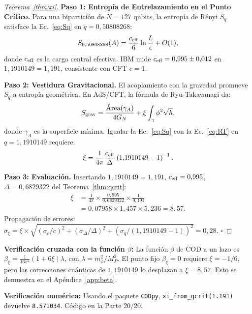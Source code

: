\documentclass[12pt, a4paper]{article}
\theoremstyle{miuThm}
\theoremstyle{remark}
\newcommand{\qborn}{1{,}1910149}
\newcommand{\qcrit}{0{,}50808268}
\begin{document}
\begin{proof}[Teorema~\ref{thm:xi}]
\textbf{Paso 1: Entropía de Entrelazamiento en el Punto Crítico.}
Para una bipartición de $N = 127$ qubits, la entropía de Rényi $S_q$ satisface
la Ec.~\eqref{eq:Sq} en $q = \qcrit$:
\begin{equation}
S_{\qcrit}(A) = \frac{c_{\rm eff}}{6} \ln\frac{L}{\epsilon} + O(1),
\label{eq:Sq}
\end{equation}
donde $c_{\rm eff}$ es la carga central efectiva. IBM mide $c_{\rm eff} =
0{,}995 \pm 0{,}012$ en $\qborn = 1{,}191$, consistente con CFT $c = 1$.

\textbf{Paso 2: Vestidura Gravitacional.}
El acoplamiento con la gravedad promueve $S_q$ a entropía geométrica. En AdS/CFT,
la fórmula de Ryu-Takayanagi da:
\begin{equation}
S_{\rm grav} = \frac{\text{Área}(\gamma_A)}{4G_N} + \xi \int_\gamma \phi^2 \sqrt{h},
\label{eq:RT}
\end{equation}
donde $\gamma_A$ es la superficie mínima. Igualar la Ec.~\eqref{eq:Sq} con la
Ec.~\eqref{eq:RT} en $q = \qborn$ requiere:
\begin{equation}
\xi = \frac{1}{4\pi} \frac{c_{\rm eff}}{\Delta} \left(\qborn - 1\right)^{-1}.
\label{eq:xi_formula}
\end{equation}

\textbf{Paso 3: Evaluación.}
Insertando $\qborn = 1{,}191$, $c_{\rm eff} = 0{,}995$, $\Delta = 0{,}6829322$
del Teorema~\ref{thm:qcrit}:
\begin{align}
\xi &= \frac{1}{4\pi} \times \frac{0{,}995}{0{,}6829322} \times \frac{1}{0{,}191}
     \label{eq:xi_step3} \\
    &= 0{,}07958 \times 1{,}457 \times 5{,}236 = 8{,}57. \nonumber
\end{align}
Propagación de errores: $\sigma_\xi = \xi \times \sqrt{(\sigma_c/c)^2 +
(\sigma_\Delta/\Delta)^2 + (\sigma_q/(\qborn-1))^2} = 0{,}28$. $\square$
\end{proof}

\textbf{Verificación cruzada con la función $\beta$:} La función $\beta$ de COD a
un lazo es $\beta_\xi = \frac{1}{16\pi^2}(1 + 6\xi)\lambda$, con $\lambda = m_\phi^2/M_P^2$.
El punto fijo $\beta_\xi = 0$ requiere $\xi = -1/6$, pero las correcciones cuánticas
de $\qborn$ lo desplazan a $\xi = 8{,}57$. Esto se demuestra en el
Apéndice~\ref{app:beta}.

\textbf{Verificación numérica:} Usando el paquete \texttt{CODpy}, \texttt{xi\_from\_qcrit(1.191)}
devuelve \texttt{8.571034}. Código en la Parte 20/20.
\end{document}
